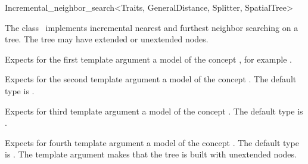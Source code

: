 

\begin{ccRefClass}{Incremental_neighbor_search<Traits, GeneralDistance, Splitter, SpatialTree>}


\ccDefinition

The class \ccRefName\ implements incremental nearest and furthest neighbor searching
on a tree. The tree may have extended or unextended nodes.


\ccParameters

Expects for the first template argument a model of the concept ,
for example .

Expects for the second template argument a model of the
concept . The default type is 
.

Expects for third template argument a model of the concept .
The default type is .

Expects for fourth template argument a model of the concept .
The default type is . The 
template argument  makes that the tree is built with unextended nodes.

\ccTypes




\end{ccRefClass}
